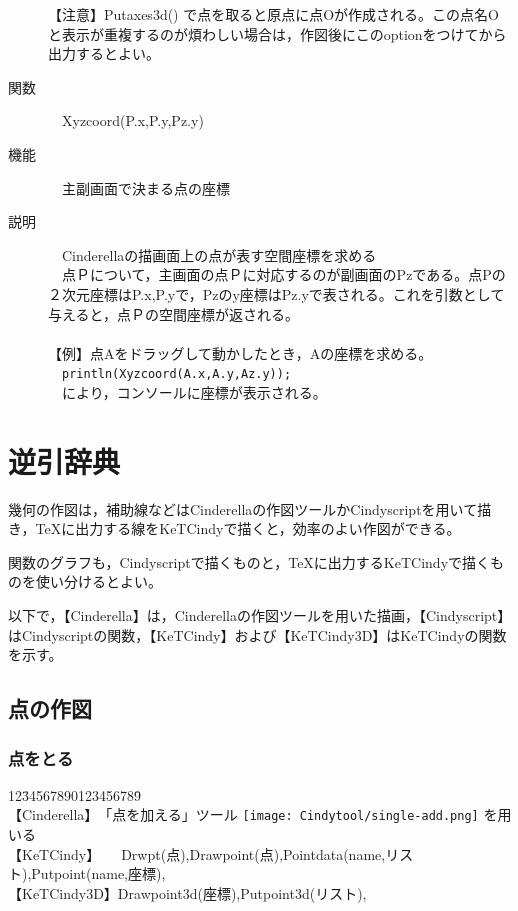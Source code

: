 \documentclass[papersize,a4paper,12pt,uplatex]{jsarticle}
\begin{document}
\begin{description}
【注意】Putaxes3d() で点を取ると原点に点Oが作成される。この点名Oと表示が重複するのが煩わしい場合は，作図後にこのoptionをつけてから出力するとよい。\\


\hypertarget{xyzcoord}{}
\item[関数]　Xyzcoord(P.x,P.y,Pz.y)
\item[機能]　主副画面で決まる点の座標
\item[説明]　Cinderellaの描画面上の点が表す空間座標を求める\\
　点Ｐについて，主画面の点Ｐに対応するのが副画面のPzである。点Pの２次元座標はP.x,P.yで，Pzのy座標はPz.yで表される。これを引数として与えると，点Ｐの空間座標が返される。\\
　\\
【例】点Aをドラッグして動かしたとき，Aの座標を求める。\\
　\verb|println(Xyzcoord(A.x,A.y,Az.y));|\\
　により，コンソールに座標が表示される。\\

\end{description}
\newpage
\section{逆引辞典}

幾何の作図は，補助線などはCinderellaの作図ツールかCindyscriptを用いて描き，TeXに出力する線をKeTCindyで描くと，効率のよい作図ができる。

関数のグラフも，Cindyscriptで描くものと，TeXに出力するKeTCindyで描くものを使い分けるとよい。

以下で，【Cinderella】は，Cinderellaの作図ツールを用いた描画，【Cindyscript】はCindyscriptの関数，【KeTCindy】および【KeTCindy3D】はKeTCindyの関数を示す。\\

\subsection{点の作図}
\subsubsection{点をとる}

\begin{tabbing}
12\=34567890123456789\=\kill\\

\>【Cinderella】　\>「点を加える」ツール \texttt{[image: Cindytool/single-add.png]} を用いる\\ 
 \>【KeTCindy】　　\>Drwpt(点),Drawpoint(点),Pointdata(name,リスト),Putpoint(name,座標),\\
 \>【KeTCindy3D】\>Drawpoint3d(座標),Putpoint3d(リスト),\\
\end{tabbing}
\end{document}
